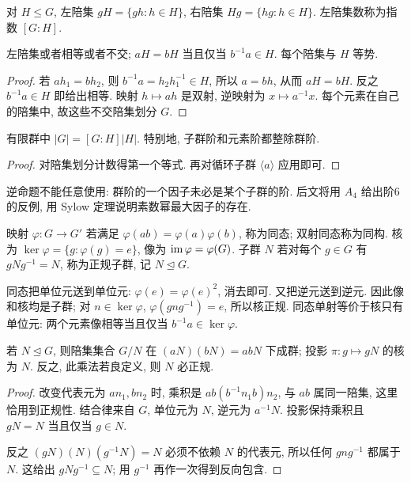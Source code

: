 \begin{definition}
对 $H\le G$, 左陪集 $gH=\{gh:h\in H\}$, 右陪集 $Hg=\{hg:h\in H\}$. 左陪集数称为指数 $[G:H]$.
\end{definition}
\begin{lemma}
左陪集或者相等或者不交; $aH=bH$ 当且仅当 $b^{-1}a\in H$. 每个陪集与 $H$ 等势.
\end{lemma}
\begin{proof}
若 $ah_1=bh_2$, 则 $b^{-1}a=h_2h_1^{-1}\in H$, 所以 $a=bh$, 从而 $aH=bH$. 反之 $b^{-1}a\in H$ 即给出相等. 映射 $h\mapsto ah$ 是双射, 逆映射为 $x\mapsto a^{-1}x$. 每个元素在自己的陪集中, 故这些不交陪集划分 $G$.
\end{proof}
\begin{theorem}[拉格朗日]
有限群中 $|G|=[G:H]|H|$. 特别地, 子群阶和元素阶都整除群阶.
\end{theorem}
\begin{proof}
对陪集划分计数得第一个等式. 再对循环子群 $\langle a\rangle$ 应用即可.
\end{proof}
逆命题不能任意使用: 群阶的一个因子未必是某个子群的阶. 后文将用 $A_4$ 给出阶6的反例, 用 Sylow 定理说明素数幂最大因子的存在.
\begin{definition}
映射 $\varphi:G\to G'$ 若满足 $\varphi(ab)=\varphi(a)\varphi(b)$, 称为同态; 双射同态称为同构. 核为 $\ker\varphi=\{g:\varphi(g)=e\}$, 像为 $\operatorname{im}\varphi=\varphi(G)$. 子群 $N$ 若对每个 $g\in G$ 有 $gNg^{-1}=N$, 称为正规子群, 记 $N\trianglelefteq G$.
\end{definition}
同态把单位元送到单位元: $\varphi(e)=\varphi(e)^2$, 消去即可. 又把逆元送到逆元. 因此像和核均是子群; 对 $n\in\ker\varphi$, $\varphi(gng^{-1})=e$, 所以核正规. 同态单射等价于核只有单位元: 两个元素像相等当且仅当 $b^{-1}a\in\ker\varphi$.
\begin{theorem}[商群的构造]\label{thm:quotient}
若 $N\trianglelefteq G$, 则陪集集合 $G/N$ 在 $(aN)(bN)=abN$ 下成群; 投影 $\pi:g\mapsto gN$ 的核为 $N$. 反之, 此乘法若良定义, 则 $N$ 必正规.
\end{theorem}
\begin{proof}
改变代表元为 $an_1,bn_2$ 时, 乘积是 $ab(b^{-1}n_1b)n_2$, 与 $ab$ 属同一陪集, 这里恰用到正规性. 结合律来自 $G$, 单位元为 $N$, 逆元为 $a^{-1}N$. 投影保持乘积且 $gN=N$ 当且仅当 $g\in N$.

反之 $(gN)(N)(g^{-1}N)=N$ 必须不依赖 $N$ 的代表元, 所以任何 $gng^{-1}$ 都属于 $N$. 这给出 $gNg^{-1}\subseteq N$; 用 $g^{-1}$ 再作一次得到反向包含.
\end{proof}
